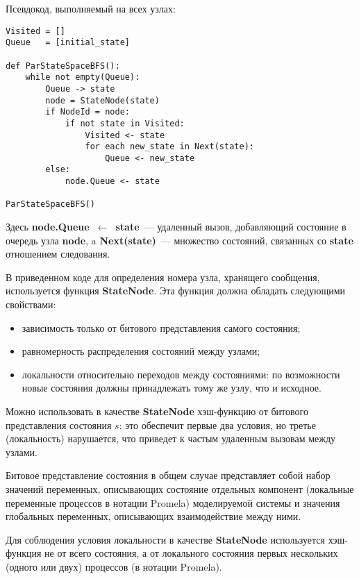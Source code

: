 \documentclass[12pt,a4paper,fleqn]{article}
\newcommand{\Code}[1]{\textbf{\mbox{#1}}}
\begin{document}
Псевдокод, выполняемый на всех узлах:

\begin{lstlisting}[style=pseudocode]
Visited = []
Queue   = [initial_state]

def ParStateSpaceBFS():
    while not empty(Queue):
        Queue -> state
        node = StateNode(state)
        if NodeId = node:
            if not state in Visited:
                Visited <- state
                for each new_state in Next(state):
                    Queue <- new_state
        else:
            node.Queue <- state

ParStateSpaceBFS()
\end{lstlisting}

Здесь \Code{node.Queue $\leftarrow$ state}~--- удаленный вызов, добавляющий состояние в
очередь узла \Code{node}, a \Code{Next(state)}~--- множество состояний, связанных со
\Code{state} отношением следования.

В приведенном коде для определения номера узла, хранящего сообщения, используется функция
\Code{StateNode}. Эта функция должна обладать следующими свойствами:

\begin{itemize}
\item зависимость только от битового представления самого состояния;

\item равномерность распределения состояний между узлами;

\item локальности относительно переходов между состояниями: по возможности новые состояния
  должны принадлежать тому же узлу, что и исходное.
\end{itemize}

Можно использовать в качестве \Code{StateNode} хэш-функцию от битового представления
состояния $s$: это обеспечит первые два условия, но третье (локальность) нарушается, что
приведет к частым удаленным вызовам между узлами.

Битовое представление состояния в общем случае представляет собой набор значений
переменных, описывающих состояние отдельных компонент (локальные переменные процессов в
нотации Promela) моделируемой системы и значения глобальных переменных, описывающих
взаимодействие между ними.

Для соблюдения условия локальности в качестве \Code{StateNode} используется хэш-функция не
от всего состояния, а от локального состояния первых нескольких (одного или двух)
процессов (в нотации Promela).
\end{document}
